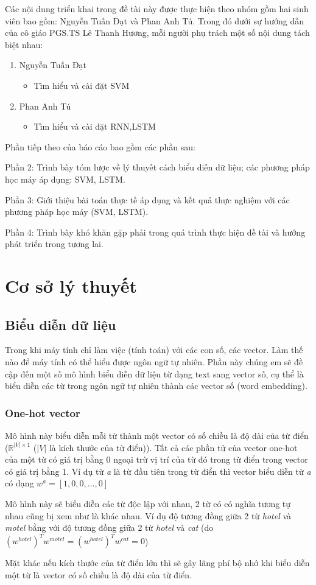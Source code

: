 \documentclass[a4paper,12pt]{report}
\begin{document}
Các nội dung triển khai trong đề tài này được thực hiện theo nhóm gồm hai sinh viên bao gồm: Nguyễn Tuấn Đạt và Phan Anh Tú. Trong đó dưới sự hướng dẫn của cô giáo PGS.TS Lê Thanh Hương, mỗi người phụ trách một số nội dung tách biệt nhau:
\begin{enumerate}
\item Nguyễn Tuấn Đạt
\begin{itemize}
\item Tìm hiểu và cài đặt SVM
\end{itemize}
\item Phan Anh Tú
\begin{itemize}
\item Tìm hiểu và cài đặt RNN,LSTM
\end{itemize}
\end{enumerate}
Phần tiếp theo của báo cáo bao gồm các phần sau:
\par Phần 2: Trình bày tóm lược về lý thuyết cách biểu diễn dữ liệu; các phương pháp học máy áp dụng: SVM, LSTM.
\par Phần 3: Giới thiệu bài toán thực tế áp dụng và kết quả thực nghiệm với các phương pháp học máy (SVM, LSTM).
\par Phần 4: Trình bày khó khăn gặp phải trong quá trình thực hiện đề tài và hướng phát triển trong tương lai.

\chapter{Cơ sở lý thuyết}
\section{Biểu diễn dữ liệu}
Trong khi máy tính chỉ làm việc (tính toán) với các con số, các vector. Làm thế nào để máy tính có thể hiểu được ngôn ngữ tự nhiên. Phần này chúng em sẽ đề cập đến một số mô hình biểu diễn dữ liệu từ dạng text sang vector số, cụ thể là biểu diễn các từ trong ngôn ngữ tự nhiên thành các vector số (word embedding).
 
\subsection{One-hot vector}
Mô hình này biểu diễn mỗi từ thành một vector có số chiều là độ dài của từ điển ($\mathbb{R}^{|V|\times 1}$ ($|V|$ là kích thước của từ điển)). Tất cả các phần tử của vector one-hot của một từ có giá trị bằng 0 ngoại trừ vị trí của từ đó trong từ điển trong vector có giá trị bằng 1. Ví dụ từ \emph{a} là từ đầu tiên trong từ điển thì vector biểu diễn từ \emph{a} có dạng $w^a = [1,0,0,...,0]$
\par Mô hình này sẽ biểu diễn các từ độc lập với nhau, 2 từ có có nghĩa tương tự nhau cũng bị xem như là khác nhau. Ví dụ độ tương đồng giữa 2 từ \emph{hotel} và \emph{motel} bằng với độ tương đồng giữa 2 từ \emph{hotel} và \emph{cat} (do $(w^{hotel})^Tw^{motel} = (w^{hotel})^Tw^{cat} = 0$)
\par Mặt khác nếu kích thước của từ điển lớn thì sẽ gây lãng phí bộ nhớ khi biểu diễn một từ là vector có số chiều là độ dài của từ điển.
\end{document}
